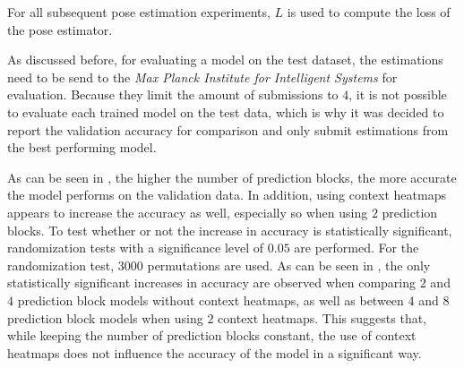 For all subsequent pose estimation experiments, $L$ is used to compute the loss of the pose estimator.

As discussed before, for evaluating a model on the test dataset, the estimations need to be send to the \textit{Max Planck Institute for Intelligent Systems} for evaluation.
Because they limit the amount of submissions to $4$, it is not possible to evaluate each trained model on the test data, which is why it was decided to report the validation accuracy for comparison and only submit estimations from the best performing model.

As can be seen in , the higher the number of prediction blocks, the more accurate the model performs on the validation data.
In addition, using context heatmaps appears to increase the accuracy as well, especially so when using $2$ prediction blocks.
To test whether or not the increase in accuracy is statistically significant, randomization tests with a significance level of $0.05$ are performed.
For the randomization test, $3000$ permutations are used.
As can be seen in , the only statistically significant increases in accuracy are observed when comparing $2$ and $4$ prediction block models without context heatmaps, as well as between $4$ and $8$ prediction block models when using $2$ context heatmaps.
This suggests that, while keeping the number of prediction blocks constant, the use of context heatmaps does not influence the accuracy of the model in a significant way.

